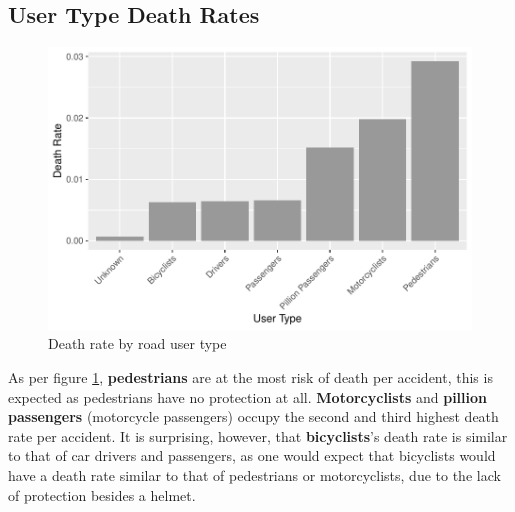\documentclass[11pt,a4paper,]{article}
\begin{document}
\subsection*{User Type Death Rates}

\begin{figure}
\centering
\includegraphics{Report_files/figure-latex/user-death-rate-1.pdf}
\caption{\label{fig:user-death-rate}Death rate by road user type}
\end{figure}

As per figure \ref{fig:user-death-rate}, \textbf{pedestrians} are at the most risk of death per accident, this is expected as pedestrians have no protection at all. \textbf{Motorcyclists} and \textbf{pillion passengers} (motorcycle passengers) occupy the second and third highest death rate per accident. It is surprising, however, that \textbf{bicyclists}'s death rate is similar to that of car drivers and passengers, as one would expect that bicyclists would have a death rate similar to that of pedestrians or motorcyclists, due to the lack of protection besides a helmet.

\printbibliography
\end{document}
